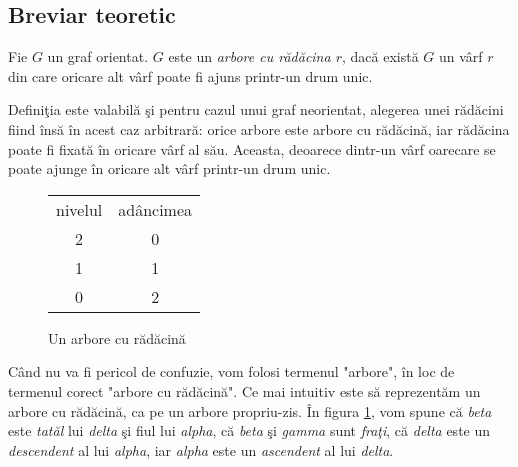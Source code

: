 \documentclass{article}
\begin{document}
\subsection{Breviar teoretic}

{\color{albastru}
Fie $G$ un graf orientat. $G$ este un \textit{arbore cu rădăcina $r$}, dacă există $G$ un vârf $r$ din care oricare alt vârf poate fi ajuns printr-un drum unic.

Definiţia este valabilă şi pentru cazul unui graf neorientat, alegerea unei rădăcini fiind însă în acest caz arbitrară: orice arbore este arbore cu rădăcină, iar rădăcina poate fi fixată în oricare vârf al său. Aceasta, deoarece dintr-un vârf oarecare se poate ajunge în oricare alt vârf printr-un drum unic.
}

\begin{figure}[h]
\begin{minipage}[t]{.3\textwidth}
	\begin{tabular}{c c}
		nivelul & adâncimea \\[.1cm]
		2 & 0 \\[1.4cm]
		1 & 1 \\[1.4cm]
		0 & 2
	\end{tabular}
\end{minipage}%
\begin{minipage}[c]{.3\textwidth}
\end{minipage}
\caption{Un arbore cu rădăcină} \label{fig:arbore}
\end{figure}

{\color{albastru} Când nu va fi pericol de confuzie, vom folosi termenul "arbore", în loc de termenul corect "arbore cu rădăcină". Ce mai intuitiv este să reprezentăm un arbore cu rădăcină, ca pe un arbore propriu-zis. În figura \ref{fig:arbore}, vom spune că \textit{beta} este \textit{tatăl} lui \textit{delta} şi fiul lui \textit{alpha}, că \textit{beta} şi \textit{gamma} sunt \textit{fraţi}, că \textit{delta} este un \textit{descendent} al lui \textit{alpha}, iar \textit{alpha} este un \textit{ascendent} al lui \textit{delta}.}
\end{document}
